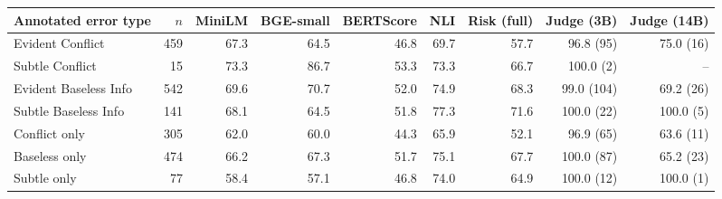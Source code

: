 \begin{tabular}{lrrrrrrrr}
\toprule
Annotated error type & $n$ & MiniLM & BGE-small & BERTScore & NLI & Risk (full) & Judge (3B) & Judge (14B) \\
\midrule
Evident Conflict & 459 & 67.3 & 64.5 & 46.8 & 69.7 & 57.7 & 96.8 (95) & 75.0 (16) \\
Subtle Conflict & 15 & 73.3 & 86.7 & 53.3 & 73.3 & 66.7 & 100.0 (2) & -- \\
Evident Baseless Info & 542 & 69.6 & 70.7 & 52.0 & 74.9 & 68.3 & 99.0 (104) & 69.2 (26) \\
Subtle Baseless Info & 141 & 68.1 & 64.5 & 51.8 & 77.3 & 71.6 & 100.0 (22) & 100.0 (5) \\
\midrule
Conflict only & 305 & 62.0 & 60.0 & 44.3 & 65.9 & 52.1 & 96.9 (65) & 63.6 (11) \\
Baseless only & 474 & 66.2 & 67.3 & 51.7 & 75.1 & 67.7 & 100.0 (87) & 65.2 (23) \\
Subtle only & 77 & 58.4 & 57.1 & 46.8 & 74.0 & 64.9 & 100.0 (12) & 100.0 (1) \\
\bottomrule
\end{tabular}
